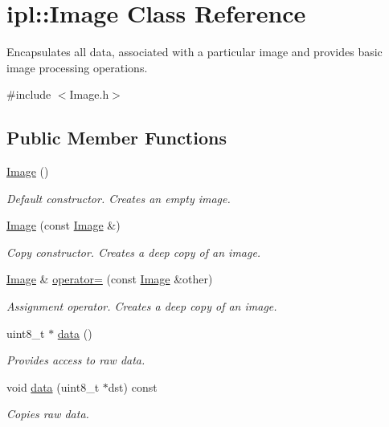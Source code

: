 \hypertarget{classipl_1_1Image}{
\section{ipl::Image Class Reference}
\label{classipl_1_1Image}
}


Encapsulates all data, associated with a particular image and provides basic image processing operations.  




{\ttfamily \#include $<$Image.h$>$}

\subsection*{Public Member Functions}
\begin{DoxyCompactItemize}
\item 
\hypertarget{classipl_1_1Image_a48b52d90c714c819ad6cddbc2768077f}{
\hyperlink{classipl_1_1Image_a48b52d90c714c819ad6cddbc2768077f}{Image} ()}
\label{classipl_1_1Image_a48b52d90c714c819ad6cddbc2768077f}

\begin{DoxyCompactList}\small\item\em Default constructor. Creates an empty image. \end{DoxyCompactList}\item 
\hypertarget{classipl_1_1Image_a43110cf78593d35fb289f5ff5ab93905}{
\hyperlink{classipl_1_1Image_a43110cf78593d35fb289f5ff5ab93905}{Image} (const \hyperlink{classipl_1_1Image}{Image} \&)}
\label{classipl_1_1Image_a43110cf78593d35fb289f5ff5ab93905}

\begin{DoxyCompactList}\small\item\em Copy constructor. Creates a deep copy of an image. \end{DoxyCompactList}\item 
\hypertarget{classipl_1_1Image_a802e130e12e6bcd8961c3aab01fd9dda}{
\hyperlink{classipl_1_1Image}{Image} \& \hyperlink{classipl_1_1Image_a802e130e12e6bcd8961c3aab01fd9dda}{operator=} (const \hyperlink{classipl_1_1Image}{Image} \&other)}
\label{classipl_1_1Image_a802e130e12e6bcd8961c3aab01fd9dda}

\begin{DoxyCompactList}\small\item\em Assignment operator. Creates a deep copy of an image. \end{DoxyCompactList}\item 
uint8\_\-t $\ast$ \hyperlink{classipl_1_1Image_a5fb1ce4497de2afbfd826f877191a712}{data} ()
\begin{DoxyCompactList}\small\item\em Provides access to raw data. \end{DoxyCompactList}\item 
void \hyperlink{classipl_1_1Image_a9c4bf0f4dfa4b8e16cfff1321afa961b}{data} (uint8\_\-t $\ast$dst) const 
\begin{DoxyCompactList}\small\item\em Copies raw data. \end{DoxyCompactList}\end{DoxyCompactItemize}
